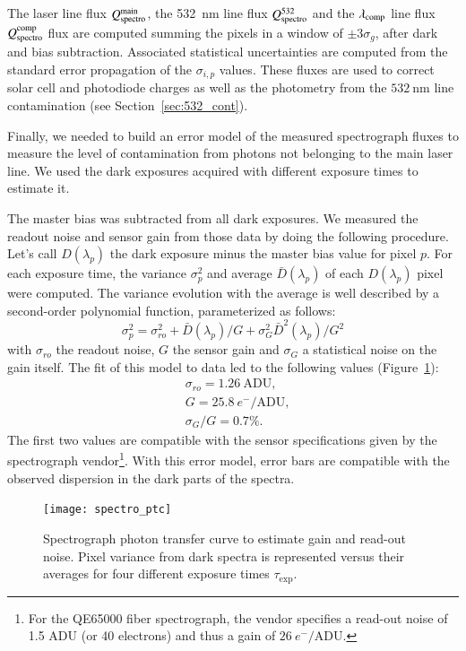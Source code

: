 The laser line flux $Q_{\mathrm{spectro}}^{\mathrm{main}}$, the \SI{532}{\nm} line flux $Q_{\mathrm{spectro}}^{532}$ and the $\lambda_{\rm comp}$ line flux $Q_{\mathrm{spectro}}^{\rm comp}$ flux are computed summing the pixels in a window of $\pm 3 \sigma_g$, after dark and bias subtraction. Associated statistical uncertainties are computed from the standard error propagation of the $\sigma_{i,p}$ values. These fluxes are used to correct solar cell and photodiode charges as well as the \SD photometry from the $\SI{532}{\nm}$ line contamination (see Section~\ref{sec:532_cont}).  %

 
Finally, we needed to build an error model of the measured spectrograph fluxes to measure the level of contamination from photons not belonging to the main laser line. We used the dark exposures acquired with different exposure times to estimate it.

The master bias was subtracted from all dark exposures. We measured the readout noise and sensor gain from those data by doing the following procedure. Let's call $D(\lambda_p)$ the dark exposure minus the master bias value for pixel $p$. For each exposure time, the variance $\sigma_p^2$ and average $\bar{D}(\lambda_p)$ of each $D(\lambda_p)$ pixel were computed. The variance evolution with the average is well described by a second-order polynomial function, parameterized as follows:
\begin{equation}\label{eq:spectro_error_model}
\sigma^2_p =\sigma_{ro}^2 +  \bar{D}(\lambda_p)/G + \sigma_G^2 \bar{D}^2(\lambda_p)/G^2
\end{equation}
with $\sigma_{ro}$ the readout noise, $G$ the sensor gain and $\sigma_G$ a statistical noise on the gain itself. The fit of this model to data led to the following values (Figure~\ref{fig:spectro_ptc}):
\begin{align}
    & \sigma_{ro} = 1.26\ \mathrm{ADU}, \\
    & G = 25.8\ e^-/\mathrm{ADU} ,\\
    & \sigma_G/G = 0.7\%.
\end{align}
The first two values are compatible with the sensor specifications given by the spectrograph vendor\footnote{For the QE65000 fiber spectrograph, the vendor specifies a read-out noise of 1.5 ADU (or 40 electrons) and thus a gain of $26\ e^-/\mathrm{ADU}$.}. 
With this error model, error bars are compatible with the observed dispersion in the dark parts of the spectra. 

\begin{figure}[!h]
\centering
\texttt{[image: spectro\_ptc]}
\caption{Spectrograph photon transfer curve to estimate gain and read-out noise. Pixel variance from dark spectra is represented versus their averages for four different exposure times $\tau_{\mathrm{exp}}$.}\label{fig:spectro_ptc}
\end{figure}





